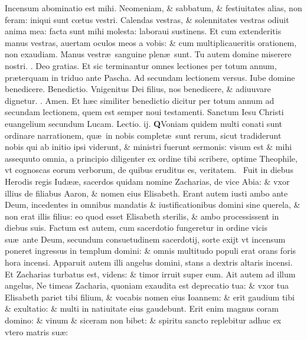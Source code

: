 \documentclass[a5paper,10pt]{book}
\def\ae{æ}
\def\oe{œ}
\begin{document}
\begin{multicols*}{2}
Incensum abominatio est mihi.
Neomeniam, \& sabbatum, \& festiuitates alias, non feram: iniqui sunt c\oe tus vestri.
Calendas vestras, \& solennitates vestras odiuit anima mea: facta sunt mihi molesta: laboraui sustinens.
Et cum extenderitis manus vestras, auertam oculos meos a vobis: \& cum multiplicaueritis orationem, non exaudiam.
Manus vestr\ae \ sanguine plen\ae \ sunt.%
\newline Tu autem domine miserere nostri. \color{red} \Rbar . \color{black} Deo gratias.
\color{red} Et sic terminantur omnes lectiones per totum annum, pr\ae terquam in triduo ante Pascha. Ad secundam lectionem versus. \color{black} Iube domine benedicere. \color{red} Benedictio. \color{black} Vnigenitus Dei filius, nos benedicere, \& adiuuvare dignetur. \color{red} \Rbar . \color{black} Amen.
\newline \color{red} Et h\ae c similiter benedictio dicitur per totum annum ad secundam lectionem, quem est semper noui testamenti. Sanctum Iesu Christi euangelium secundum Lucam. Lectio. ij. \color{black}
\vspace{-2em}
\lettrine[lines=2]{\bfseries \color{red} Q}{}Voniam quidem multi conati sunt ordinare narrationem, qu\ae \ in nobis complet\ae \ sunt rerum, sicut tradiderunt nobis qui ab initio ipsi viderunt, \& ministri fuerunt sermonis: visum est \& mihi assequuto omnia, a principio diligenter ex ordine tibi scribere, optime Theophile, vt cognoscas eorum verborum, de quibus eruditus es, veritatem. \textdagger \ 
Fuit in diebus Herodis regis Iud\ae \ae , sacerdos quidam nomine Zacharias, de vice Abia: \& vxor illius de filiabus Aaron, \& nomen eius Elisabeth.
Erant autem iusti ambo ante Deum, incedentes in omnibus mandatis \& iustificationibus domini sine querela, \& non erat illis filius: eo quod esset Elisabeth sterilis, \& ambo processissent in diebus suis.
Factum est autem, cum sacerdotio fungeretur in ordine vicis su\ae \ ante Deum, secundum consuetudinem sacerdotij, sorte exijt vt incensum poneret ingressus in templum domini: \& omnis multitudo populi erat orans foris hora incensi.
Apparuit autem illi angelus domini, stans a dextris altaris incensi.
Et Zacharias turbatus est, videns: \& timor irruit super eum.
Ait autem ad illum angelus, Ne timeas Zacharia, quoniam exaudita est deprecatio tua: \& vxor tua Elisabeth pariet tibi filium, \& vocabis nomen eius Ioannem: \& erit gaudium tibi \& exultatio: \& multi in natiuitate eius gaudebunt.
Erit enim magnus coram domino: \& vinum \& siceram non bibet: \& spiritu sancto replebitur adhuc ex vtero matris su\ae :

\end{multicols*}
\end{document}
